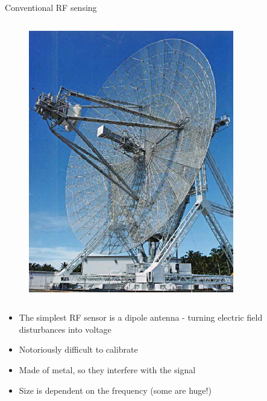 \begin{columnframe}{Conventional RF sensing}
    \begin{column}{0.5\textwidth}
        \begin{figure}
            \centering
            \includegraphics[width=0.8\textwidth]{images/radar_antenna_huge.jpg}
        \end{figure}
    \end{column}
    \begin{column}{0.5\textwidth}
        \begin{itemize}
            \item The simplest RF sensor is a dipole antenna - turning electric field disturbances into voltage
            \item Notoriously difficult to calibrate
            \item Made of metal, so they interfere with the signal
            \item Size is dependent on the frequency (some are huge!)
        \end{itemize}
    \end{column}
\end{columnframe}

